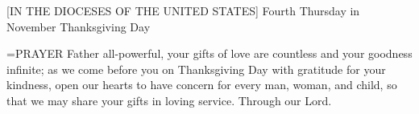  [IN THE DIOCESES OF THE UNITED STATES]
Fourth Thursday in November
Thanksgiving Day

\hangindent=\parindent \small{PRAYER 
Father all-powerful,
your gifts of love are countless
and your goodness infinite;
as we come before you on Thanksgiving Day
with gratitude for your kindness,
open our hearts to have concern
for every man, woman, and child,
so that we may share your gifts in loving service.
Through our Lord.\\}
 
